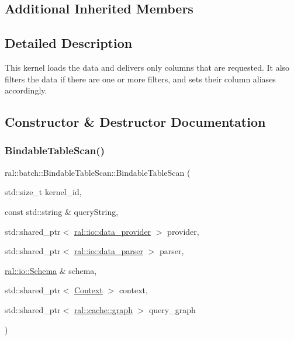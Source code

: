 \subsection*{Additional Inherited Members}


\subsection{Detailed Description}
This kernel loads the data and delivers only columns that are requested. It also filters the data if there are one or more filters, and sets their column aliases accordingly. 

\subsection{Constructor \& Destructor Documentation}
\mbox{\label{classral_1_1batch_1_1BindableTableScan_adc92c38cd526bfbf6b1586fbfa4058cc}} 
\subsubsection{\texorpdfstring{Bindable\+Table\+Scan()}{BindableTableScan()}}
{\footnotesize\ttfamily ral\+::batch\+::\+Bindable\+Table\+Scan\+::\+Bindable\+Table\+Scan (\begin{DoxyParamCaption}\item[{std\+::size\+\_\+t}]{kernel\+\_\+id,  }\item[{const std\+::string \&}]{query\+String,  }\item[{std\+::shared\+\_\+ptr$<$ \hyperlink{classral_1_1io_1_1data__provider}{ral\+::io\+::data\+\_\+provider} $>$}]{provider,  }\item[{std\+::shared\+\_\+ptr$<$ \hyperlink{classral_1_1io_1_1data__parser}{ral\+::io\+::data\+\_\+parser} $>$}]{parser,  }\item[{\hyperlink{classral_1_1io_1_1Schema}{ral\+::io\+::\+Schema} \&}]{schema,  }\item[{std\+::shared\+\_\+ptr$<$ \hyperlink{classblazingdb_1_1manager_1_1Context}{Context} $>$}]{context,  }\item[{std\+::shared\+\_\+ptr$<$ \hyperlink{classral_1_1cache_1_1graph}{ral\+::cache\+::graph} $>$}]{query\+\_\+graph }\end{DoxyParamCaption})}

